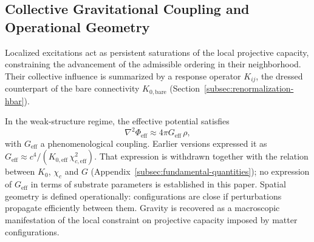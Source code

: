 \subsection{Collective Gravitational Coupling and Operational Geometry}
  \label{subsec:collective-coupling}

  Localized excitations act as persistent saturations of the local
  projective capacity, constraining the advancement of the admissible
  ordering in their neighborhood.
  Their collective influence is summarized by a response operator
  $K_{ij}$, the dressed counterpart of the bare connectivity
  $K_{0,\mathrm{bare}}$
  (Section~\ref{subsec:renormalization-hbar}).

  In the weak-structure regime, the effective potential satisfies
  \begin{equation}
    \nabla^2 \Phi_{\text{eff}}
    \approx 4\pi G_{\text{eff}}\,\rho,
    \label{eq:poisson-emergent}
  \end{equation}
  with $G_{\text{eff}}$ a phenomenological coupling.
  Earlier versions expressed it as
  $G_{\text{eff}} \approx c^4/(K_{0,\text{eff}}\,\chi_{c,\text{eff}}^2)$.
  That expression is withdrawn together with the relation between $K_0$, $\chi_c$ and $G$
  (Appendix~\ref{subsec:fundamental-quantities}); no expression of $G_{\text{eff}}$ in terms of substrate
  parameters is established in this paper.
  Spatial geometry is defined operationally: configurations are close if
  perturbations propagate efficiently between them.
  Gravity is recovered as a macroscopic manifestation of the local
  constraint on projective capacity imposed by matter configurations.
